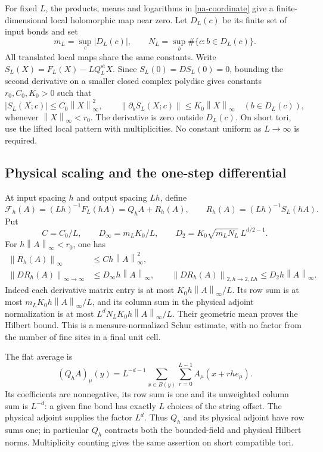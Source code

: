 \documentclass[11pt]{article}
\theoremstyle{remark}\newtheorem{remark}[theorem]{Remark}
\newcommand{\norm}[1]{\left\lVert#1\right\rVert}
\begin{document}
For fixed $L$, the products, means and logarithms in
\eqref{na-coordinate} give a finite-dimensional local holomorphic
map near zero. Let $D_L(c)$ be its finite set of input bonds and set
\[
 m_L=\sup_c|D_L(c)|,\qquad
 N_L=\sup_b\#\{c:b\in D_L(c)\}.
\]
All translated local maps share the same constants. Write
$S_L(X)=F_L(X)-LQ_L^{\mathrm{st}}X$. Since
$S_L(0)=DS_L(0)=0$, bounding the second derivative on a smaller
closed complex polydisc gives constants $r_0,C_0,K_0>0$ such that
\begin{equation}
 |S_L(X;c)|\le C_0\norm{X}_\infty^2,
 \qquad
 \norm{\partial_bS_L(X;c)}\le K_0\norm{X}_\infty
 \quad (b\in D_L(c)),
 \label{na-local-jet-bounds}
\end{equation}
whenever $\norm{X}_\infty<r_0$. The derivative is zero outside
$D_L(c)$. On short tori, use the lifted local pattern with
multiplicities. No constant uniform as $L\to\infty$ is required.

\subsection{Physical scaling and the one-step differential}
\label{na-one-step}

At input spacing $h$ and output spacing $Lh$, define
\begin{equation}
 \mathcal F_h(A)=(Lh)^{-1}F_L(hA)=Q_hA+R_h(A),
 \qquad R_h(A)=(Lh)^{-1}S_L(hA).
 \label{na-physical-map}
\end{equation}
Put
\[
 C=C_0/L,\qquad D_\infty=m_LK_0/L,\qquad
 D_2=K_0\sqrt{m_LN_L}\,L^{d/2-1}.
\]
For $h\norm{A}_\infty<r_0$, one has
\begin{align}
 \norm{R_h(A)}_\infty&\le Ch\norm{A}_\infty^2,
 \label{na-one-step-rem}\\
 \norm{DR_h(A)}_{\infty\to\infty}
    &\le D_\infty h\norm{A}_\infty,
 \qquad
 \norm{DR_h(A)}_{2,h\to2,Lh}
    \le D_2h\norm{A}_\infty.
 \label{na-one-step-der}
\end{align}
Indeed each derivative matrix entry is at most
$K_0h\norm{A}_\infty/L$. Its row sum is at most
$m_LK_0h\norm{A}_\infty/L$, and its column sum in the physical
adjoint normalization is at most
$L^dN_LK_0h\norm{A}_\infty/L$. Their geometric mean proves the
Hilbert bound. This is a measure-normalized Schur estimate, with no
factor from the number of fine sites in a final unit cell.

The flat average is
\[
 (Q_hA)_\mu(y)=L^{-d-1}\sum_{x\in B(y)}\sum_{r=0}^{L-1}
                         A_\mu(x+rh e_\mu).
\]
Its coefficients are nonnegative, its row sum is one and its
unweighted column sum is $L^{-d}$: a given fine bond has exactly
$L$ choices of the string offset. The physical adjoint supplies the
factor $L^d$. Thus $Q_h$ and its physical adjoint have row sums one;
in particular $Q_h$ contracts both the bounded-field and physical
Hilbert norms. Multiplicity counting gives the same assertion on
short compatible tori.
\end{document}
